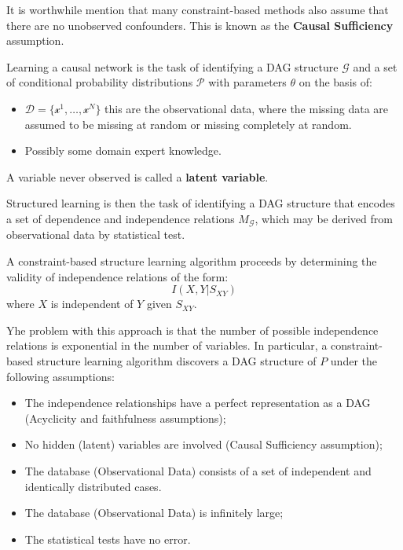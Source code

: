It is worthwhile mention that many constraint-based methods also assume that there
are no unobserved confounders. This is known as the \textbf{Causal Sufficiency}
assumption.

Learning a causal network is the task of identifying a DAG structure $\mathcal{G}$
and a set of conditional probability distributions $\mathcal{P}$ with parameters
$\theta$ on the basis of:
\begin{itemize}
    \item $\mathcal{D} = \{\mathcal{x}^1, \ldots, \mathcal{x}^N\}$ this are the
          observational data, where the missing data are assumed to be missing
          at random or missing completely at random.
    \item Possibly some domain expert knowledge.
\end{itemize}

A variable never observed is called a \textbf{latent variable}.

Structured learning is then the task of identifying a DAG structure that encodes
a set of dependence and independence relations $M_{\mathcal{G}}$, which may be
derived from observational data by statistical test.

A constraint-based structure learning algorithm proceeds by determining the validity
of independence relations of the form:
\begin{equation}
    I(X, Y| S_{XY})
\end{equation}
where $X$ is independent of $Y$ given $S_{XY}$.

Yhe problem with this approach is that the number of possible independence relations
is exponential in the number of variables. In particular, a constraint-based
structure learning algorithm discovers a DAG structure of $P$ under the following
assumptions:
\begin{itemize}
    \item The independence relationships have a perfect representation as a DAG
          (Acyclicity and faithfulness assumptions);
    \item No hidden (latent) variables are involved (Causal Sufficiency assumption);
    \item The database (Observational Data) consists of a set of independent and
          identically distributed cases.
    \item The database (Observational Data) is infinitely large;
    \item The statistical tests have no error.
\end{itemize}

